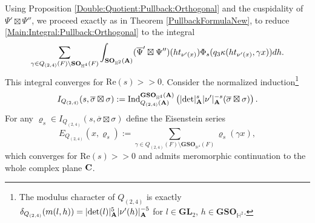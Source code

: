 \documentclass[11pt, reqno]{amsart}
\theoremstyle{plain}
\theoremstyle{definition}
\theoremstyle{remark}
\theoremstyle{plain}
\def\C{{\bf C}}
\def\A{{\bf A}}
\def\GSO{{\mathbf{GSO}}}
\def\GL{\mathbf{GL}}
\begin{document}
Using Proposition \ref{Double:Quotient:Pullback:Orthogonal} and the cuspidality of $\Psi'\boxtimes\Psi''$, we proceed exactly as in Theorem \ref{PullbackFormulaNew}, to reduce \eqref{Main:Integral:Pullback:Orthogonal} to the integral 
\begin{equation}\label{First:Eisenstein:Second:Pullback}\sum_{\gamma\in Q_{(2,4)}(F)\setminus \mathbf{SO}_{\mathbb{H}^4}(F)}\int_{ \mathbf{SO}_{\mathbb{H}^2}(\A)}(\overline{\Psi}'\boxtimes\Psi'')(ht_{\nu'(x)})\Phi_{s}(q_3\kappa(ht_{\nu'(x)},\gamma x))dh.\end{equation}
This integral converges for $\mathrm{Re}(s)>>0$. Consider the normalized induction\footnote{The modulus character of $Q_{(2,4)}$ is exactly  $\delta_{Q_{(2,4)}}(m(l,h)) = |\mathrm{det}(l)|_{\A}^{5}|\nu'(h)|_{\A}^{-5}$ for $l \in \GL_2$, $h \in \GSO_{\mathbb{H}^2}$.} \begin{equation}\label{induction:orthogonal}I_{Q_{(2,4)}}(s,\overline{\sigma}\boxtimes \sigma) := \mathrm{Ind}_{Q_{(2,4)}(\A)}^{\mathbf{GSO}_{\mathbb{H}^4}(\A)} \left(|\mathrm{det}|_{\A}^{s}|\nu'|^{-s}_{\A}(\overline{\sigma}\boxtimes \sigma) \right).\end{equation}
For any $\varrho_{s}\in I_{Q_{(2,4)}}(s,\overline{\sigma}\boxtimes \sigma)$ define the Eisenstein series
\[E_{Q_{(2,4)}}(x,\varrho_{s}) := \sum_{\gamma\in Q_{(2,4)}(F)\setminus \GSO_{\mathbb{H}^4}(F)}\varrho_{s}(\gamma x),\]
which converges for $\mathrm{Re}(s)>>0$ and admits meromorphic continuation to the whole complex plane $\C$.
\end{document}
